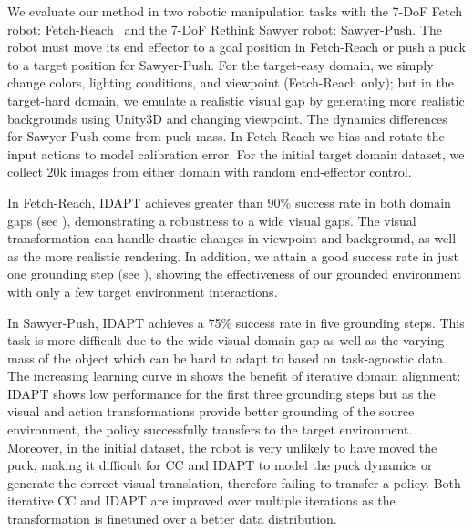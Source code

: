 We evaluate our method in two robotic manipulation tasks with the 7-DoF Fetch robot: Fetch-Reach~\citep{plappert2018robotics} and the 7-DoF Rethink Sawyer robot: Sawyer-Push. The robot must move its end effector to a goal position in Fetch-Reach or push a puck to a target position for Sawyer-Push. For the target-easy domain, we simply change colors, lighting conditions, and viewpoint (Fetch-Reach only); but in the target-hard domain, we emulate a realistic visual gap by generating more realistic backgrounds using Unity3D and changing viewpoint.  The dynamics differences for Sawyer-Push come from puck mass. In Fetch-Reach we bias and rotate the input actions to model calibration error.  For the initial target domain dataset, we collect 20k images from either domain with random end-effector control.

In Fetch-Reach, IDAPT achieves greater than 90\% success rate in both domain gaps (see ), demonstrating a robustness to a wide visual gaps.  The visual transformation can handle drastic changes in viewpoint and background, as well as the more realistic rendering.  In addition, we attain a good success rate in just one grounding step (see ), showing the effectiveness of our grounded environment with only a few target environment interactions.


In Sawyer-Push, IDAPT achieves a 75\% success rate in five grounding steps. This task is more difficult due to the wide visual domain gap as well as the varying mass of the object which can be hard to adapt to based on task-agnostic data.  The increasing learning curve in  shows the benefit of iterative domain alignment: IDAPT shows low performance for the first three grounding steps but as the visual and action transformations provide better grounding of the source environment, the policy successfully transfers to the target environment.  Moreover, in the initial dataset, the robot is very unlikely to have moved the puck, making it difficult for CC and IDAPT to model the puck dynamics or generate the correct visual translation, therefore failing to transfer a policy.  Both iterative CC and IDAPT are improved over multiple iterations as the transformation is finetuned over a better data distribution.



